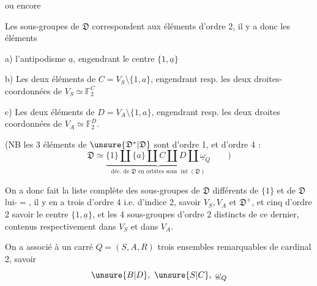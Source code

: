 ou encore 

Les sous-groupes  de $\mathfrak{D}$ correspondent aux
éléments d'ordre 2, il y a donc les éléments

a) l'antipodisme $\underline{a}$, engendrant le centre $\{1,\underline{a}\}$

b) Les deux éléments de $C=V_S\setminus\{1,a\}$, engendrant resp. les deux
droites-coordonnées de $V_S\simeq\mathbb{F}_2^C$

c) Les deux éléments de $D=V_A\setminus\{1,a\}$, engendrant resp. les deux
droites coordonnées de $V_A\simeq\mathbb{F}_2^D$.


(NB les  3 éléments de
$\unsure{\mathfrak{D}^*|\mathfrak{D}}$ sont d'ordre 1, et d'ordre 4 :
\[
\mathfrak{D}\simeq
\underbrace{\{1\}\amalg\{a\}\amalg C\amalg D\amalg\underline{\omega}_Q}
_{\text{déc. de }\mathfrak{D}\text{ en orbites sous }\operatorname{int}(\mathfrak{D})}
\qquad)
\]

On a donc fait la liste complète des sous-groupes de $\mathfrak{D}$ différents
de $\{1\}$ et de $\mathfrak{D}$ lui-$=$, il y en a trois d'ordre 4 i.e.
d'indice 2, savoir $V_S,V_A$ et $\mathfrak{D}^+$,
et cinq d'ordre 2 savoir le centre $\{1,\underline{a}\}$,
et les 4 sous-groupes  d'ordre 2 distincts de ce dernier,
contenus respectivement dans $V_S$ et dans $V_A$.

On a associé à un carré $Q=(S,A,R)$ trois ensembles remarquables de cardinal 2,
savoir
\[
\unsure{B|D},\ \unsure{S|C},\ \underline{\omega}_Q
\]
